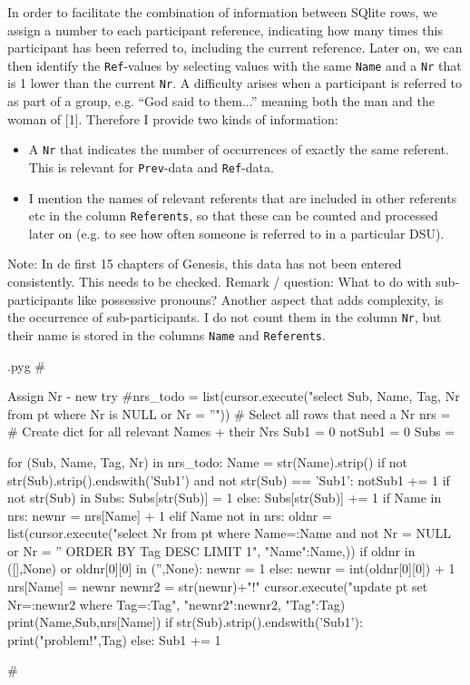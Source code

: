 \documentclass{report}
\makeatletter
\newcommand{\mi}[1]{\lstinline{#1}}
\newenvironment{python}{%
  \VerbatimEnvironment
  \minted@resetoptions
  \setkeys{minted@opt}{}
      \begin{VerbatimOut}{\jobname.pyg}}
{%
      \end{VerbatimOut}
      \minted@pygmentize{python}
      \DeleteFile{\jobname.pyg}}
\makeatother
\begin{document}
In order to facilitate the combination of information between SQlite rows,
we assign a number to each participant reference, indicating how many times
this participant has been referred to, including the current reference.
Later on, we can then identify the \mi{Ref}-values by selecting values with the
same \mi{Name} and a \mi{Nr} that is 1 lower than the current \mi{Nr}.
A difficulty arises when a participant is referred to as part of a group,
e.g. ``God said to them...'' meaning both the man and the woman of [1].
Therefore I provide two kinds of information:
\begin{itemize}
\item A \mi{Nr} that indicates the number of occurrences of exactly the same referent. This is relevant for \mi{Prev}-data and \mi{Ref}-data.
\item I mention the names of relevant referents that are included in other referents etc in the column \mi{Referents}, so that these can be counted and processed later on (e.g. to see how often someone is referred to in a particular DSU).
\end{itemize}
Note: In de first 15 chapters of Genesis, this data has not been entered consistently. This needs to be checked.
Remark / question: What to do with sub-participants like possessive pronouns?
Another aspect that adds complexity, is the occurrence of sub-participants.
I do not count them in the column \mi{Nr}, but their name is stored in the columns
\mi{Name} and \mi{Referents}.


\begin{python}
#{{{ Assign Nr - new try
#nrs_todo = list(cursor.execute("select Sub, Name, Tag, Nr from pt where Nr is NULL or Nr = ''"))  # Select all rows that need a Nr
nrs = {}    # Create dict for all relevant Names + their Nrs
Sub1 = 0
notSub1 = 0
Subs = {}

for (Sub, Name, Tag, Nr) in nrs_todo:
    Name = str(Name).strip()
    if not str(Sub).strip().endswith('Sub1') and not str(Sub) == 'Sub1':
        notSub1 += 1
        if not str(Sub) in Subs:
            Subs[str(Sub)] = 1
        else:
            Subs[str(Sub)] += 1
        if Name in nrs:
            newnr = nrs[Name] + 1
        elif Name not in nrs:
            oldnr = list(cursor.execute("select Nr from pt where Name=:Name and not Nr = NULL or Nr = '' ORDER BY Tag DESC LIMIT 1", {"Name":Name,}))
            if oldnr in ([],None) or oldnr[0][0] in ('',None):
                newnr = 1
            else:
                newnr = int(oldnr[0][0]) + 1
        nrs[Name] = newnr
        newnr2 = str(newnr)+"!"
        cursor.execute("update pt set Nr=:newnr2 where Tag=:Tag", {"newnr2":newnr2, "Tag":Tag})
        print(Name,Sub,nrs[Name])
        if str(Sub).strip().endswith('Sub1'):
            print("problem!",Tag)
    else:
        Sub1 += 1

#}}}
\end{python}
\end{document}
